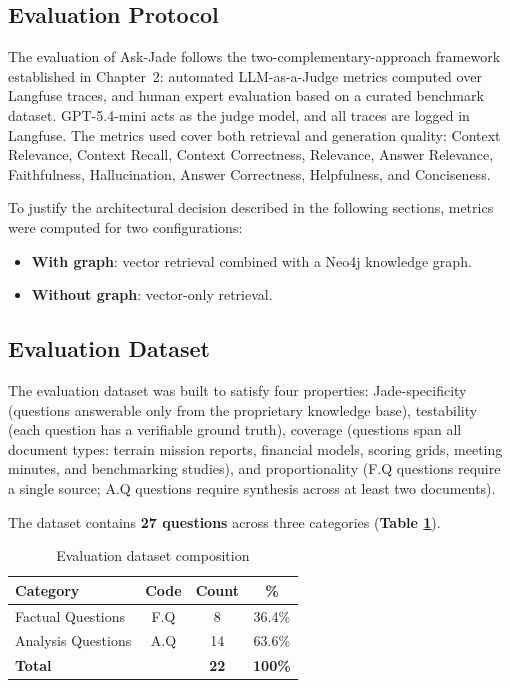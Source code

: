 \subsection{Evaluation Protocol}

The evaluation of Ask-Jade follows the two-complementary-approach
framework established in Chapter~2:
automated LLM-as-a-Judge metrics computed over Langfuse traces, and
human expert evaluation based on a curated benchmark dataset. GPT-5.4-mini
acts as the judge model, and all traces are logged in Langfuse. The
metrics used cover both retrieval and generation quality: Context
Relevance, Context Recall, Context Correctness, Relevance, Answer
Relevance, Faithfulness, Hallucination, Answer Correctness, Helpfulness,
and Conciseness.

To justify the architectural decision described in the following sections,
metrics were computed for two configurations:

\begin{itemize}
  \item \textbf{With graph}: vector retrieval combined with a Neo4j
        knowledge graph.
  \item \textbf{Without graph}: vector-only retrieval.
\end{itemize}

\subsection{Evaluation Dataset}
\label{sec:eval_dataset}

The evaluation dataset was built to satisfy four properties:
Jade-specificity (questions answerable only from the proprietary
knowledge base), testability (each question has a verifiable ground
truth), coverage (questions span all document types: terrain mission
reports, financial models, scoring grids, meeting minutes, and
benchmarking studies), and proportionality (F.Q questions require a
single source; A.Q questions require synthesis across at least two
documents).

The dataset contains \textbf{27 questions} across three categories
(\textbf{Table \ref{tab:dataset_composition}}).

\begin{table}[H]
  \centering
  \caption{Evaluation dataset composition}
  \label{tab:dataset_composition}
  \begin{tabular}{|l|c|c|c|}
    \hline
    \textbf{Category} & \textbf{Code} & \textbf{Count} & \textbf{\%} \\
    \hline
    Factual Questions  & F.Q & 8  & 36.4\% \\
    \hline
    Analysis Questions & A.Q & 14 & 63.6\% \\
    \hline
    \textbf{Total} & & \textbf{22} & \textbf{100\%} \\
    \hline
  \end{tabular}
\end{table}

